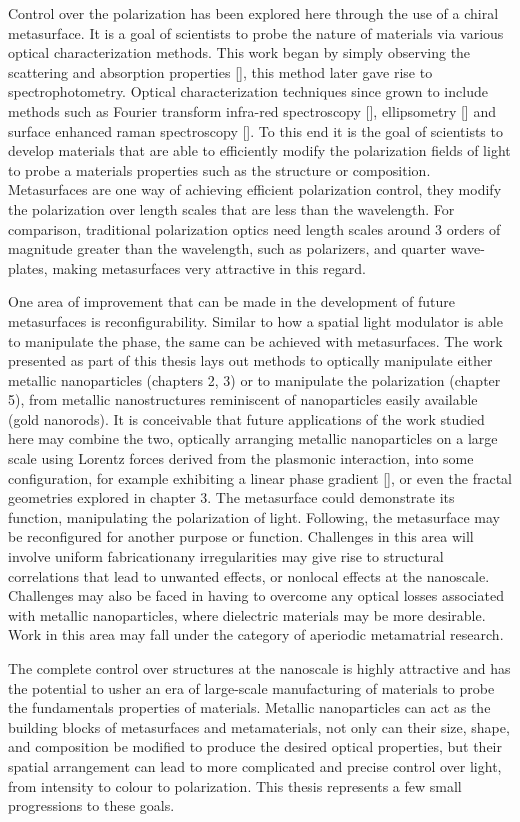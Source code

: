 Control over the polarization has been explored here through the use of a chiral metasurface. It is a goal of scientists to probe the nature of materials via various optical characterization methods. This work began by simply observing the scattering and absorption properties [\cite{Mie}], this method later gave rise to spectrophotometry. Optical characterization techniques since grown to include methods such as Fourier transform infra-red spectroscopy [\cite{Chan:2016}], ellipsometry [\cite{Theeten:1981}] and surface enhanced raman spectroscopy [\cite{Wang:2015}]. To this end it is the goal of scientists to develop materials that are able to efficiently modify the polarization fields of light to probe a materials properties such as the structure or composition. Metasurfaces are one way of achieving efficient polarization control, they modify the polarization over length scales that are less than the wavelength. For comparison, traditional polarization optics need length scales around 3 orders of magnitude greater than the wavelength, such as polarizers, and quarter wave-plates, making metasurfaces very attractive in this regard.

One area of improvement that can be made in the development of future metasurfaces is reconfigurability. Similar to how a spatial light modulator is able to manipulate the phase, the same can be achieved with metasurfaces. The work presented as part of this thesis lays out methods to optically manipulate either metallic nanoparticles (chapters 2, 3) or to manipulate the polarization (chapter 5), from metallic nanostructures reminiscent of nanoparticles easily available (gold nanorods). It is conceivable that future applications of the work studied here may combine the two, optically arranging metallic nanoparticles on a large scale using Lorentz forces derived from the plasmonic interaction, into some configuration, for example exhibiting a linear phase gradient [\cite{Aieta}], or even the fractal geometries explored in chapter 3. The metasurface could demonstrate its function, manipulating the polarization of light. Following, the metasurface may be reconfigured for another purpose or function. Challenges in this area will involve uniform fabrication\textemdash any irregularities may give rise to structural correlations that lead to unwanted effects, or nonlocal effects at the nanoscale. Challenges may also be faced in having to overcome any optical losses associated with metallic nanoparticles, where dielectric materials may be more desirable. Work in this area may fall under the category of aperiodic metamatrial research.

The complete control over structures at the nanoscale is highly attractive and has the potential to usher an era of large-scale manufacturing of materials to probe the fundamentals properties of materials. Metallic nanoparticles can act as the building blocks of metasurfaces and metamaterials, not only can their size, shape, and composition be modified to produce the desired optical properties, but their spatial arrangement can lead to more complicated and precise control over light, from intensity to colour to polarization. This thesis represents a few small progressions to these goals.